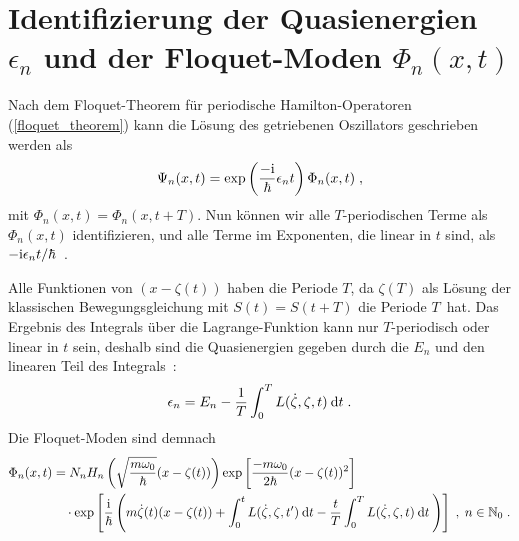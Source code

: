      \section{\texorpdfstring{Identifizierung der Quasienergien $\epsilon_n$ und der Floquet-Moden $\Phi_n(x,t)$}{Identifizierung der Quasienergien epsilon_n und der Floquet-Moden Phi_n(x,t)}}
        Nach dem Floquet-Theorem für periodische Hamilton-Operatoren (\ref{floquet_theorem}) kann die Lösung des getriebenen Oszillators geschrieben werden als
        \begin{equation}
          \Psi_n(x,t) = \exp\left(\frac{-\text i}{\hbar}\epsilon_nt\right)\Phi_n(x,t) \; ,
        \end{equation}
        mit $\Phi_n(x,t)=\Phi_n(x,t+T)$.
        Nun können wir alle $T$-periodischen Terme als $\Phi_n(x,t)$ identifizieren, und alle Terme im Exponenten, die linear in $t$ sind, als $-\text i\epsilon_n t/\hbar$~\cite{haengi}.

        Alle Funktionen von $(x-\zeta(t))$ haben die Periode $T$, da $\zeta(T)$ als Lösung der klassischen Bewegungsgleichung mit $S(t)=S(t+T)$ die Periode $T$ \,hat. Das
        Ergebnis des Integrals über die Lagrange-Funktion kann nur $T$-periodisch oder linear in $t$ sein, deshalb sind die Quasienergien gegeben durch die $E_n$ und den linearen Teil des Integrals~\cite{haengi}:
        \begin{equation}
          \epsilon_n = E_n - \frac{1}{T} \int_0^T L(\dot \zeta, \zeta, t) \: \text d t \; .
          \label{ep}
        \end{equation}
        Die Floquet-Moden sind demnach
        \begin{align}
          \begin{split}
            \Phi_n(x,t) &=
             N_nH_n\left(\sqrt{\frac{m\omega_0}{\hbar}}(x-\zeta(t))\right) \exp\left[\frac{-m\omega_0}{2\hbar}(x-\zeta(t))^2\right] \\
            &\quad \cdot \exp\left[\frac{\text i}{\hbar}\left(m\dot \zeta(t)(x-\zeta(t))+\int_0^tL(\dot \zeta,\zeta,t')\:\text d t-\frac{t}{T} \int_0^T L(\dot \zeta,\zeta,t)\:\text dt\: \right)\right] \; ,
            \;n \in \mathbb{N}_0 \; .
            \label{floquet_moden_einzelner}
          \end{split}
        \end{align}


